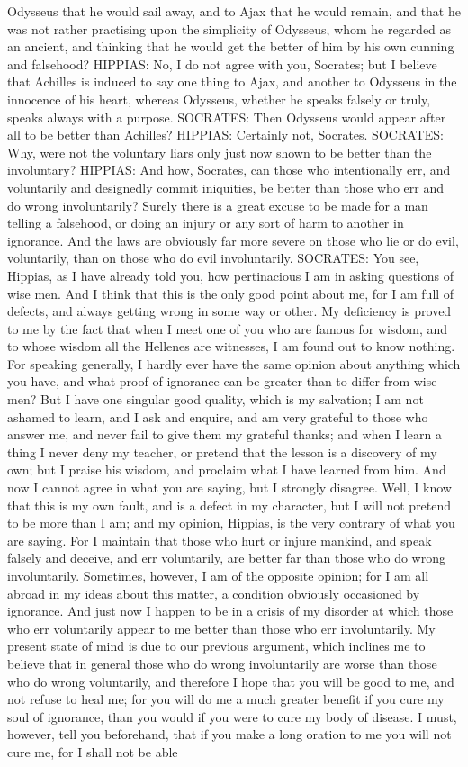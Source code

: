 \documentclass[11pt,letter]{article}
\begin{document}
Odysseus that he would sail away, and to Ajax that he would remain, and that he was not rather practising upon the simplicity of Odysseus, whom he regarded as an ancient, and thinking that he would get the better of him by his own cunning and falsehood? HIPPIAS:  No, I do not agree with you, Socrates; but I believe that Achilles is induced to say one thing to Ajax, and another to Odysseus in the innocence of his heart, whereas Odysseus, whether he speaks falsely or truly, speaks always with a purpose. SOCRATES:  Then Odysseus would appear after all to be better than Achilles? HIPPIAS:  Certainly not, Socrates. SOCRATES:  Why, were not the voluntary liars only just now shown to be better than the involuntary? HIPPIAS:  And how, Socrates, can those who intentionally err, and voluntarily and designedly commit iniquities, be better than those who err and do wrong involuntarily? Surely there is a great excuse to be made for a man telling a falsehood, or doing an injury or any sort of harm to another in ignorance. And the laws are obviously far more severe on those who lie or do evil, voluntarily, than on those who do evil involuntarily. SOCRATES:  You see, Hippias, as I have already told you, how pertinacious I am in asking questions of wise men. And I think that this is the only good point about me, for I am full of defects, and always getting wrong in some way or other. My deficiency is proved to me by the fact that when I meet one of you who are famous for wisdom, and to whose wisdom all the Hellenes are witnesses, I am found out to know nothing. For speaking generally, I hardly ever have the same opinion about anything which you have, and what proof of ignorance can be greater than to differ from wise men? But I have one singular good quality, which is my salvation; I am not ashamed to learn, and I ask and enquire, and am very grateful to those who answer me, and never fail to give them my grateful thanks; and when I learn a thing I never deny my teacher, or pretend that the lesson is a discovery of my own; but I praise his wisdom, and proclaim what I have learned from him. And now I cannot agree in what you are saying, but I strongly disagree. Well, I know that this is my own fault, and is a defect in my character, but I will not pretend to be more than I am; and my opinion, Hippias, is the very contrary of what you are saying. For I maintain that those who hurt or injure mankind, and speak falsely and deceive, and err voluntarily, are better far than those who do wrong involuntarily. Sometimes, however, I am of the opposite opinion; for I am all abroad in my ideas about this matter, a condition obviously occasioned by ignorance. And just now I happen to be in a crisis of my disorder at which those who err voluntarily appear to me better than those who err involuntarily. My present state of mind is due to our previous argument, which inclines me to believe that in general those who do wrong involuntarily are worse than those who do wrong voluntarily, and therefore I hope that you will be good to me, and not refuse to heal me; for you will do me a much greater benefit if you cure my soul of ignorance, than you would if you were to cure my body of disease. I must, however, tell you beforehand, that if you make a long oration to me you will not cure me, for I shall not be able 
\end{document}
